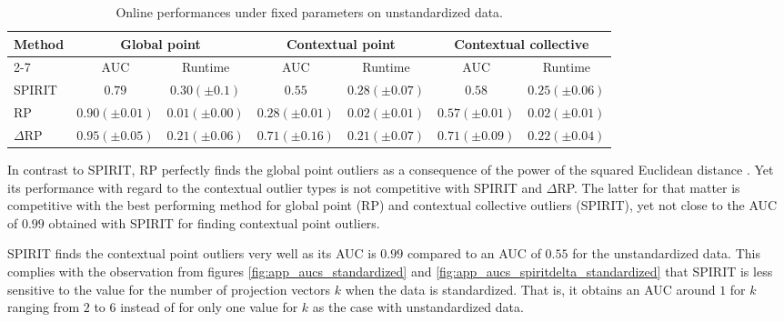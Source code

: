 \begin{table}[h]
	\centering
	\caption{Online performances under fixed parameters on unstandardized data.}
	\label{tab:app_analysis_results}
	\small
	\hspace*{-0.25cm}
	\begin{tabular}{l c c c c c c}
		\toprule	
		\multirow{3}{*}{\textbf{Method}}				&  \multicolumn{2}{c}{\textbf{Global point}}	& \multicolumn{2}{c}{\textbf{Contextual point}} & \multicolumn{2}{c}{\textbf{Contextual collective}}\\	
		\cmidrule{2-7}
		& 	AUC 	& Runtime 	& AUC 	& Runtime 	& AUC 	& Runtime 	\\
		\midrule
		SPIRIT	& $0.79	 $	&$	0.30 (\pm 0.1)	$&$	0.55 $	& $	0.28 (\pm 0.07)$	& 	$	0.58$	& $0.25	(\pm 0.06)$ \\
		
		RP  	& $0.90	(\pm 0.01)$	& $\mathbf{0.01 (\pm 0.00)}$ & $0.28 (\pm 0.01)$	& $\mathbf{0.02 (\pm 0.01)}$	& 	$	0.57 (\pm 0.01)$	& $\mathbf{0.02	(\pm 0.01)}$ \\
		
		$\Delta$RP		& $\mathbf{0.95 (\pm 0.05)}$	&	$0.21 (\pm 0.06)$	&	$\mathbf{0.71 (\pm 0.16)}$	& 	$0.21 (\pm 0.07)$	&	$\mathbf{0.71 (\pm 0.09)}$		&  $0.22 (\pm 0.04)$	\\
		\bottomrule
	\end{tabular}
	\vspace{0.1cm}
\end{table}

In contrast to SPIRIT, RP perfectly finds the global point outliers as a consequence of the power of the squared Euclidean distance \cite{zimek2012survey}. Yet its performance with regard to the contextual outlier types is not competitive with SPIRIT and $\Delta$RP. The latter for that matter is competitive with the best performing method for global point (RP) and contextual collective outliers (SPIRIT), yet not close to the AUC of $0.99$ obtained with SPIRIT for finding contextual point outliers. 

SPIRIT finds the contextual point outliers very well as its AUC is $0.99$ compared to an AUC of $0.55$ for the unstandardized data. This complies with the observation from figures \ref{fig:app_aucs_standardized} and \ref{fig:app_aucs_spiritdelta_standardized} that SPIRIT is less sensitive to the value for the number of projection vectors $k$ when the data is standardized. That is, it obtains an AUC around $1$ for $k$ ranging from $2$ to $6$ instead of for only one value for $k$ as the case with unstandardized data. 

